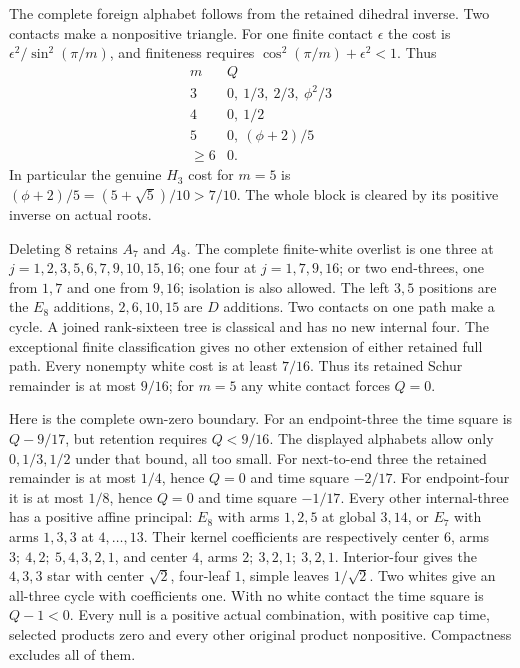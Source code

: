 \documentclass[11pt]{article}
\theoremstyle{definition}
\theoremstyle{remark}
\begin{document}
The complete foreign alphabet follows from the retained dihedral
inverse. Two contacts make a nonpositive triangle.
For one finite contact \(\epsilon\) the cost is
\(\epsilon^2/\sin^2(\pi/m)\), and finiteness requires
\(\cos^2(\pi/m)+\epsilon^2<1\). Thus
\[
\begin{array}{c|c}
m& Q\\ \hline
3&0,\ 1/3,\ 2/3,\ \phi^2/3\\
4&0,\ 1/2\\
5&0,\ (\phi+2)/5\\
\geq6&0 .
\end{array}
\]
In particular the genuine \(H_3\) cost for \(m=5\) is
\((\phi+2)/5=(5+\sqrt5)/10>7/10\).
The whole block is cleared by its positive inverse on actual roots.

Deleting \(8\) retains \(A_7\) and \(A_8\).
The complete finite-white overlist is one three at
\(j=1,2,3,5,6,7,9,10,15,16\);
one four at \(j=1,7,9,16\);
or two end-threes, one from \(1,7\) and one from \(9,16\);
isolation is also allowed.
The left \(3,5\) positions are the \(E_8\) additions,
\(2,6,10,15\) are \(D\) additions. Two contacts on one path
make a cycle. A joined rank-sixteen tree is classical and has
no new internal four. The exceptional finite classification gives
no other extension of either retained full path.
Every nonempty white cost is at least \(7/16\).
Thus its retained Schur remainder is at most \(9/16\);
for \(m=5\) any white contact forces \(Q=0\).

Here is the complete own-zero boundary.
For an endpoint-three the time square is \(Q-9/17\), but
retention requires \(Q<9/16\). The displayed alphabets allow only
\(0,1/3,1/2\) under that bound, all too small.
For next-to-end three the retained remainder is at most \(1/4\),
hence \(Q=0\) and time square \(-2/17\).
For endpoint-four it is at most \(1/8\), hence \(Q=0\)
and time square \(-1/17\).
Every other internal-three has a positive affine principal:
\(E_8\) with arms \(1,2,5\) at global \(3,14\), or
\(E_7\) with arms \(1,3,3\) at \(4,\ldots,13\).
Their kernel coefficients are respectively center \(6\), arms
\(3;\ 4,2;\ 5,4,3,2,1\), and center \(4\), arms
\(2;\ 3,2,1;\ 3,2,1\).
Interior-four gives the \(4,3,3\) star with center \(\sqrt2\),
four-leaf \(1\), simple leaves \(1/\sqrt2\).
Two whites give an all-three cycle with coefficients one.
With no white contact the time square is \(Q-1<0\).
Every null is a positive actual combination, with positive cap
time, selected products zero and every other original product
nonpositive. Compactness excludes all of them.
\end{document}
